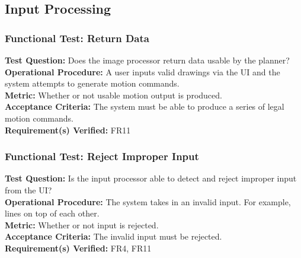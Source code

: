 
\subsection{Input Processing}
\label{sec:verification_image}

\subsubsection{Functional Test: Return Data}
\label{test:image_ft_data}
\textbf{Test Question:} Does the image processor return data usable by the planner?\\
\textbf{Operational Procedure:} A user inputs valid drawings via the UI and the system attempts to generate motion commands.\\
\textbf{Metric:} Whether or not usable motion output is produced.\\
\textbf{Acceptance Criteria:} The system must be able to produce a series of legal motion commands.\\
\textbf{Requirement(s) Verified:} FR11

\subsubsection{Functional Test: Reject Improper Input}
\label{test:image_ft_reject}
\textbf{Test Question:} Is the input processor able to detect and reject improper input from the UI?\\
\textbf{Operational Procedure:} The system takes in an invalid input. For example, lines on top of each other. \\
\textbf{Metric:} Whether or not input is rejected.\\
\textbf{Acceptance Criteria:} The invalid input must be rejected.\\
\textbf{Requirement(s) Verified:} FR4, FR11
